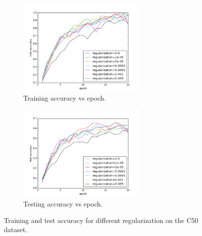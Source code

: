 \documentclass{article} %
\begin{document}
\begin{figure}[H]
\begin{subfigure}{0.5\linewidth}
\centering
\includegraphics[width=0.7\textwidth]{figures/epoch_train_accu_rg_c.png} 
\caption{Training accuracy vs epoch.}
\end{subfigure}
\begin{subfigure}{0.5\linewidth}
\centering
\includegraphics[width=0.7\textwidth]{figures/epoch_test_accu_rg_c.png} 
\caption{Testing accuracy vs epoch.}
\end{subfigure}
\caption{Training and test accuracy for different regularization on the C50 dataset.}
\label{rg_test_accu_c50_ag}
\end{figure}
\end{document}
